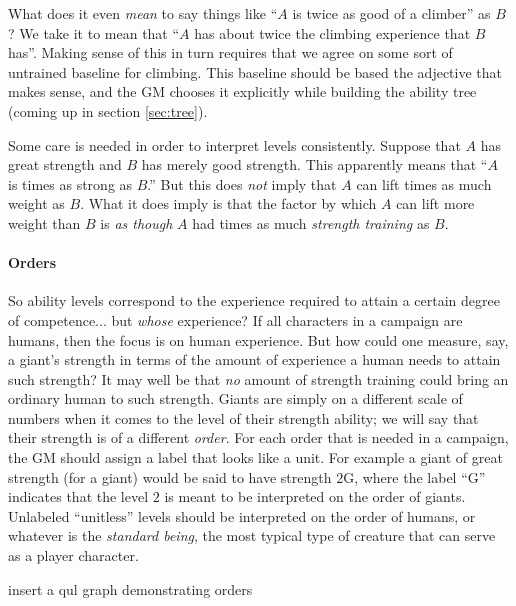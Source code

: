 \documentclass[12pt]{article}
\newcommand{\notes}[1]{{\color{Tan} #1}}
\newcommand{\emdex}[1]{\emph{#1}\index{#1}}
\begin{document}
What does it even \emph{mean} to say things like ``$A$ is twice as good of a climber'' as $B$?
We take it to mean that ``$A$ has about twice the climbing experience that $B$ has''.
Making sense of this in turn requires that we agree on some sort of untrained baseline for climbing.
This baseline should be based the adjective that makes sense, and the GM chooses it
explicitly while building the ability tree (coming up in section \ref{sec:tree}).

Some care is needed in order to interpret levels consistently.
Suppose that $A$ has great strength and $B$ has merely good strength.
This apparently means that ``$A$ is  times as strong as $B$.''
But this does \emph{not} imply that $A$ can lift  times as much weight as $B$.
What it does imply is that the factor by which $A$ can lift more weight than $B$ is
\emph{as though} $A$ had  times as much \emph{strength training} as $B$.

\paragraph{Orders}
So ability levels correspond to the experience required to attain a certain degree of competence... but \emph{whose} experience?
If all characters in a campaign are humans, then the focus is on human experience.
But how could one measure, say, a giant's strength in terms of the amount of experience a human needs to attain such strength?
It may well be that \emph{no} amount of strength training could bring an ordinary human to such strength.
Giants are simply on a different scale of numbers when it comes to the level of their strength ability;
we will say that their strength is of a different \emdex{order}.
For each order that is needed in a campaign, the GM should assign a label that looks like a unit.
For example a giant of great strength (for a giant) would be said to have strength $2$G,
where the label ``G'' indicates that the level $2$ is meant to be interpreted on the order of giants.
Unlabeled ``unitless'' levels should be interpreted on the order of humans, or whatever is the
\emdex{standard being}, the most typical type of creature that can serve as a player character.

\notes{insert a qul graph demonstrating orders}
\end{document}
